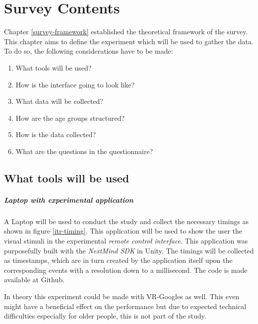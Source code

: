     \chapter{Survey Contents}\label{survey-contents}

        Chapter \ref{survey-framework} established the theoretical framework of the survey. This chapter aims to define the experiment which will be used to gather the data. To do so, the following considerations have to be made:

        \begin{enumerate}
            \item What tools will be used?
            \item How is the interface going to look like?
            \item What data will be collected?
            \item How are the age groups structured?
            \item How is the data collected?
            \item What are the questions in the questionnaire?
        \end{enumerate}

        \section{What tools will be used}

            \paragraph{Laptop with experimental application}

                A Laptop will be used to conduct the study and collect the necessary timings as shown in figure \ref*{itr-timing}. This application will be used to show the user the visual stimuli in the experimental \textit{remote control interface}. This application was purposefully built with the \textit{NextMind SDK} in Unity. The timings will be collected as timestamps, which are in turn created by the application itself upon the corresponding events with a resolution down to a millisecond. The code is made available at Github\cite[]{GitHub.04102021}.

                \medskip

                In theory this experiment could be made with VR-Googles as well. This even might have a beneficial effect on the performance but due to expected technical difficulties especially for older people, this is not part of the study.

